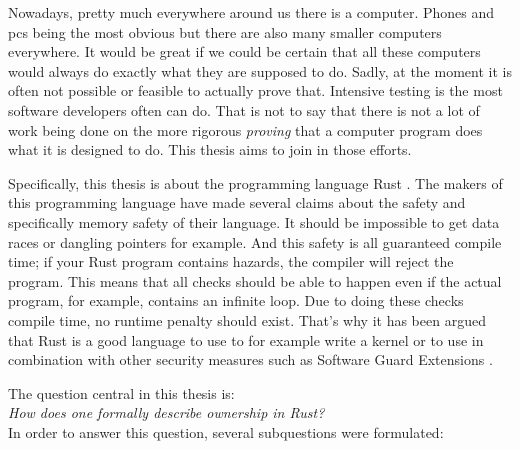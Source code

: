 Nowadays, pretty much everywhere around us there is a computer. Phones and pcs being the most obvious but there are also many smaller computers everywhere. It would be great if we could be certain that all these computers would always do exactly what they are supposed to do. Sadly, at the moment it is often not possible or feasible to actually prove that. Intensive testing is the most software developers often can do. That is not to say that there is not a lot of work being done on the more rigorous \emph{proving} that a computer program does what it is designed to do. This thesis aims to join in those efforts. 

Specifically, this thesis is about the programming language Rust \cite{matsakis2014rust}. The makers of this programming language have made several claims about the safety and specifically memory safety of their language. It should be impossible to get data races or dangling pointers for example. And this safety is all guaranteed compile time; if your Rust program contains hazards, the compiler will reject the program. This means that all checks should be able to happen even if the actual program, for example, contains an infinite loop. Due to doing these checks compile time, no runtime penalty should exist. That's why it has been argued that Rust is a good language to use to for example write a kernel \cite{levy2017kernel} or to use in combination with other security measures such as Software Guard Extensions \cite{ding2017sgx}. 


The question central in this thesis is: \\
\emph{How does one formally describe ownership in Rust?}\\

In order to answer this question, several subquestions were formulated: 

